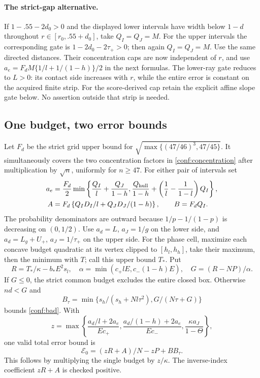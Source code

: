 \paragraph{The strict-gap alternative.}
If $1-.55-2d_0>0$ and the displayed lower intervals have width below
$1-d$ throughout $r\in[r_0,.55+d_0]$, take $Q_I=Q_J=M$.
For the upper intervals the corresponding gate is
$1-2d_0-2\tau_+>0$; then again $Q_I=Q_J=M$.
Use the same directed distances. Their concentration caps are now
independent of $r$, and use
$a_e=F_dM\{1/l+1/(1-h)\}/2$ in the next formulas.
The lower-ray gate reduces to $L>0$: its contact side increases with
$r$, while the entire error is constant on the acquired finite strip.
For the score-derived cap retain the explicit affine slope gate below.
No assertion outside that strip is needed.

\subsection{One budget, two error bounds}
Let $F_d$ be the strict grid upper bound for
$\sqrt{\max\{(47/46)^3,47/45\}}$. It simultaneously covers the two
concentration factors in \eqref{conf:concentration} after multiplication by
$\sqrt n$, uniformly for $n\ge47$. For either pair of intervals set
\begin{align*}
 a_e&=\frac{F_d}{2}\min\left\{\frac{Q_I}l+\frac{Q_J}{1-h},
 \frac{Q_{\rm hull}}{1-h}+\left(\frac1l-\frac1{1-l}\right)Q_I\right\},\\
 A&=F_d\left\{Q_ID_I/l+Q_JD_J/(1-h)\right\},\qquad B=F_dQ_I.
\end{align*}
The probability denominators are outward because $1/p-1/(1-p)$ is
decreasing on $(0,1/2)$.
Use $a_d=L$, $a_J=1/g$ on the lower side, and
$a_d=L_g+U_+$, $a_J=1/\tau_+$ on the upper side.
For the phase cell, maximize each concave budget quadratic at its
vertex clipped to $[h_l,h_h]$, take their maximum, then the minimum
with $T$; call this upper bound $T_*$. Put
\[
 R=T_*/\kappa-b_*E^2s_l,
 \quad\alpha=\min(c_+lE,c_-(1-h)E),\quad G=(R-NP)/\alpha.
\]
If $G\le0$, the strict common budget excludes the entire closed box.
Otherwise $nd<G$ and
\[
 B_\tau=\min\{s_h/(s_h+Nl\tau^2),G/(N\tau+G)\}
\]
bounds \eqref{conf:bad}. With
\[
 z=\max\left\{\frac{a_d/l+2a_e}{Ec_+},
 \frac{a_d/(1-h)+2a_e}{Ec_-},\frac{\kappa a_J}{1-\Theta}\right\},
\]
one valid total error bound is
\begin{equation}\label{conf:oldbound}
 \mathcal E_0=(zR+A)/N-zP+B B_\tau.
\end{equation}
This follows by multiplying the single budget by $z/\kappa$.
The inverse-index coefficient $zR+A$ is checked positive.

